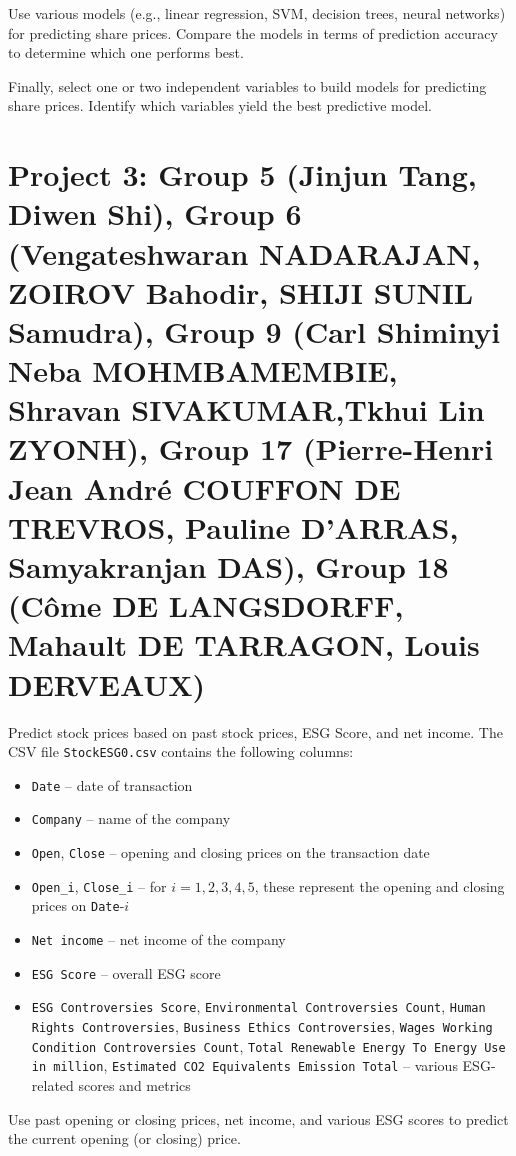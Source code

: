 \documentclass{article}
\begin{document}
Use various models (e.g., linear regression, SVM, decision trees, neural networks) for predicting share prices. Compare the models in terms of prediction accuracy to determine which one performs best.

Finally, select one or two independent variables to build models for predicting share prices. Identify which variables yield the best predictive model.







\section*{Project 3:  Group 5 (Jinjun Tang, Diwen Shi), Group 6 (Vengateshwaran NADARAJAN, ZOIROV Bahodir, SHIJI SUNIL Samudra), Group 9 (Carl Shiminyi Neba MOHMBAMEMBIE, Shravan SIVAKUMAR,Tkhui Lin ZYONH),
Group 17 (Pierre-Henri Jean  André COUFFON DE TREVROS, Pauline D'ARRAS, Samyakranjan DAS),
Group 18 (Côme DE LANGSDORFF, Mahault DE TARRAGON, Louis DERVEAUX)
}
 Predict stock prices based on past stock prices, ESG Score, and net income. The CSV file \lstinline$StockESG0.csv$ contains the following columns: \begin{itemize} \item \lstinline$Date$ -- date of transaction \item \lstinline$Company$ -- name of the company \item \lstinline$Open$, \lstinline$Close$ -- opening and closing prices on the transaction date \item \lstinline$Open_i$, \lstinline$Close_i$ -- for $i=1,2,3,4,5$, these represent the opening and closing prices on \lstinline$Date$-$i$ \item \lstinline$Net income$ -- net income of the company \item \lstinline$ESG Score$ -- overall ESG score \item \lstinline$ESG Controversies Score$, \lstinline$Environmental Controversies Count$, \lstinline$Human Rights Controversies$, \lstinline$Business Ethics Controversies$, \lstinline$Wages Working Condition Controversies Count$, \lstinline$Total Renewable Energy To Energy Use in million$, \lstinline$Estimated CO2 Equivalents Emission Total$ -- various ESG-related scores and metrics \end{itemize}

Use past opening or closing prices, net income, and various ESG scores to predict the current opening (or closing) price.
\end{document}
